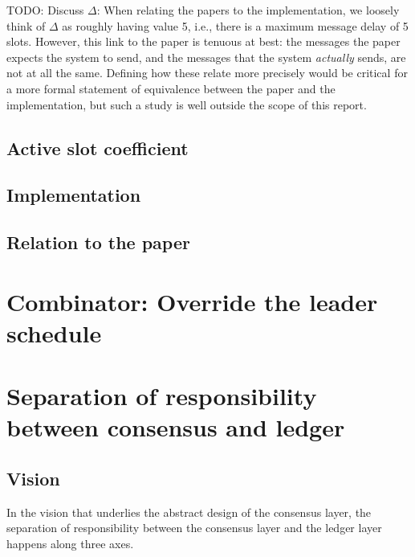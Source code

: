 TODO: Discuss $\Delta$: When relating the papers to the implementation, we
loosely think of $\Delta$ as roughly having value 5, i.e., there is a maximum
message delay of 5 slots. However, this link to the paper is tenuous at best:
the messages the paper expects the system to send, and the messages that the
system \emph{actually} sends, are not at all the same. Defining how these relate
more precisely would be critical for a more formal statement of equivalence
between the paper and the implementation, but such a study is well outside the
scope of this report.

\subsection{Active slot coefficient}
\label{optimum:f}

\subsection{Implementation}

\subsection{Relation to the paper}
\label{optimum-paper}

\cite{cryptoeprint:2018:378}

\section{Combinator: Override the leader schedule}
\label{consensus:override-leader-schedule}

\cleardoublepage
\section{Separation of responsibility between consensus and ledger}

\subsection{Vision}

In the vision that underlies the abstract design of the consensus layer,
the separation of responsibility between the consensus layer and the
ledger layer happens along three axes.


